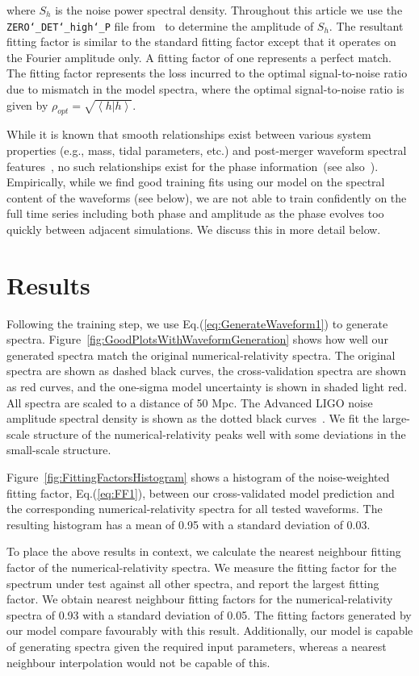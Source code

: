 \documentclass[../Thesis.tex]{subfiles}
\begin{document}
        where $S_h$ is the noise power spectral  density. Throughout this article we use the \texttt{ZERO\char`_DET\char`_high\char`_P} file from~\cite{PSD:aLIGO} to determine the amplitude of $S_h$. The resultant fitting factor is similar to the standard fitting factor except that it operates on the Fourier amplitude only. A fitting factor of one represents a perfect match. The fitting factor represents the loss incurred to the  optimal signal-to-noise ratio due to mismatch in the model spectra, where the optimal signal-to-noise ratio is given by $\rho_{opt}=\sqrt{	\left<h|h\right>}$.\par
        While it is known that smooth relationships exist between various system properties (e.g., mass, tidal parameters, etc.) and post-merger waveform spectral features~\cite{Bauswein2012,Takami2014,Bernuzzi2015,Takami2015,Bauswein2015,Rezzolla2016}, no such relationships exist for the phase information~(see also~\cite{Messenger2014}). Empirically, while we find good training fits using our model on the spectral content of the waveforms (see below), we are not able to train confidently on the full time series including both phase and amplitude as the phase evolves too quickly between adjacent simulations.  We discuss this in more detail below. \par 

    \section{Results}
        Following the training step, we use Eq.(\ref{eq:GenerateWaveform1}) to generate spectra.  Figure~\ref{fig:GoodPlotsWithWaveformGeneration} shows how well our generated spectra match the original numerical-relativity spectra. The original spectra are shown as dashed black curves, the cross-validation spectra are shown as red curves, and the one-sigma model uncertainty is shown in shaded light red. All spectra are scaled to a distance of 50 Mpc. The Advanced LIGO noise amplitude spectral density is shown as the dotted black curves~\cite{PSD:aLIGO}.  We fit the large-scale structure of the numerical-relativity peaks well with some deviations in the small-scale structure. \par Figure~\ref{fig:FittingFactorsHistogram} shows a histogram of the noise-weighted fitting factor, Eq.(\ref{eq:FF1}), between our cross-validated model prediction and the corresponding numerical-relativity spectra for all tested waveforms. The resulting histogram has a mean of 0.95 with a standard deviation of 0.03. \par
        To place the above results in context, we calculate the nearest neighbour fitting factor of the numerical-relativity spectra. We measure the fitting factor for the spectrum under test against all other spectra, and report the largest fitting factor. We obtain nearest neighbour fitting factors for the numerical-relativity spectra of 0.93 with a standard deviation of 0.05. The fitting factors generated by our model compare favourably with this result. Additionally, our model is capable of generating spectra given the required input parameters, whereas a nearest neighbour interpolation would not be capable of this.\par
           
\end{document}
